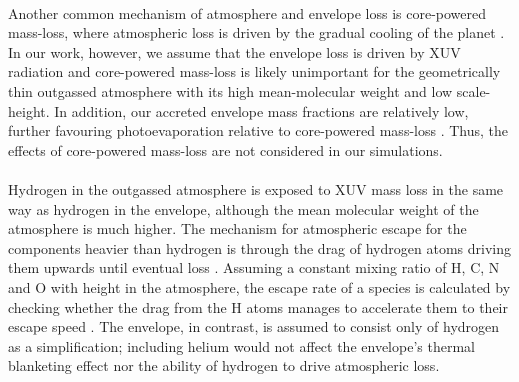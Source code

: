 \documentclass[bibyear,tradiabstract]{aa}
\begin{document}
\\
Another common mechanism of atmosphere and envelope loss is core-powered mass-loss, where atmospheric loss is driven by the gradual cooling of the planet \citep{Gupta&Schlichting2019}. In our work, however, we assume that the envelope loss is driven by XUV radiation and core-powered mass-loss is likely unimportant for the geometrically thin outgassed atmosphere with its high mean-molecular weight and low scale-height. In addition, our accreted envelope mass fractions are relatively low, further favouring photoevaporation relative to core-powered mass-loss \citep{Owen&Schlichting2024}. Thus, the effects of core-powered mass-loss are not considered in our simulations.\\
\\
Hydrogen in the outgassed atmosphere is exposed to XUV mass loss in the same way as hydrogen in the envelope, although the mean molecular weight of the atmosphere is much higher. The mechanism for atmospheric escape for the components heavier than hydrogen is through the drag of hydrogen atoms driving them upwards until eventual loss \citep{Zahnle&Kasting1986,Hunten+1987,Erkaev+2014,Tian2015}. Assuming a constant mixing ratio of H, C, N and O with height in the atmosphere, the escape rate of a species is calculated by checking whether the drag from the H atoms manages to accelerate them to their escape speed \citep{Johansen+2023II}. {The envelope, in contrast, is assumed to consist only of hydrogen as a simplification; including helium would not affect the envelope's thermal blanketing effect nor the ability of hydrogen to drive atmospheric loss.} 
\end{document}
